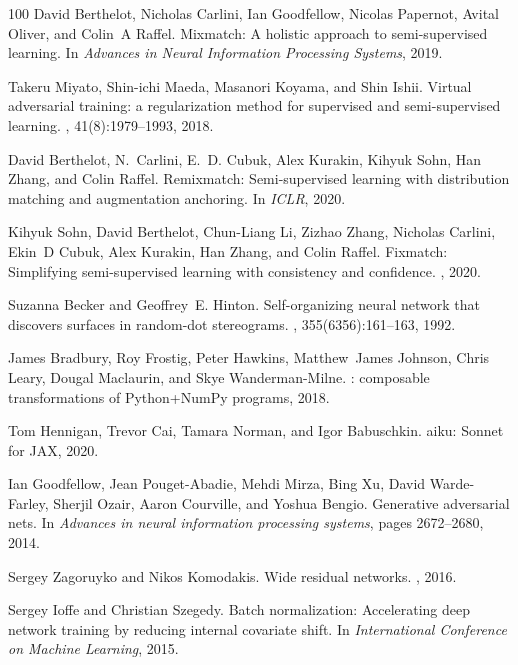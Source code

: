 \documentclass{article}
\begin{document}
{\begin{thebibliography}{100}
David Berthelot, Nicholas Carlini, Ian Goodfellow, Nicolas Papernot, Avital
  Oliver, and Colin~A Raffel.
\newblock Mixmatch: A holistic approach to semi-supervised learning.
\newblock In {\em Advances in Neural Information Processing Systems}, 2019.

Takeru Miyato, Shin-ichi Maeda, Masanori Koyama, and Shin Ishii.
\newblock Virtual adversarial training: a regularization method for supervised
  and semi-supervised learning.
,
  41(8):1979--1993, 2018.

David Berthelot, N.~Carlini, E.~D. Cubuk, Alex Kurakin, Kihyuk Sohn, Han Zhang,
  and Colin Raffel.
\newblock Remixmatch: Semi-supervised learning with distribution matching and
  augmentation anchoring.
\newblock In {\em ICLR}, 2020.

Kihyuk Sohn, David Berthelot, Chun-Liang Li, Zizhao Zhang, Nicholas Carlini,
  Ekin~D Cubuk, Alex Kurakin, Han Zhang, and Colin Raffel.
\newblock Fixmatch: Simplifying semi-supervised learning with consistency and
  confidence.
, 2020.

Suzanna Becker and Geoffrey~E. Hinton.
\newblock Self-organizing neural network that discovers surfaces in random-dot
  stereograms.
, 355(6356):161--163, 1992.

James Bradbury, Roy Frostig, Peter Hawkins, Matthew~James Johnson, Chris Leary,
  Dougal Maclaurin, and Skye Wanderman-Milne.
: composable transformations of {P}ython+{N}um{P}y programs,
  2018.

Tom Hennigan, Trevor Cai, Tamara Norman, and Igor Babuschkin.
aiku: {S}onnet for {JAX}, 2020.

Ian Goodfellow, Jean Pouget-Abadie, Mehdi Mirza, Bing Xu, David Warde-Farley,
  Sherjil Ozair, Aaron Courville, and Yoshua Bengio.
\newblock Generative adversarial nets.
\newblock In {\em Advances in neural information processing systems}, pages
  2672--2680, 2014.

Sergey Zagoruyko and Nikos Komodakis.
\newblock Wide residual networks.
, 2016.

Sergey Ioffe and Christian Szegedy.
\newblock Batch normalization: Accelerating deep network training by reducing
  internal covariate shift.
\newblock In {\em International Conference on Machine Learning}, 2015.


\end{thebibliography}}
\end{document}
